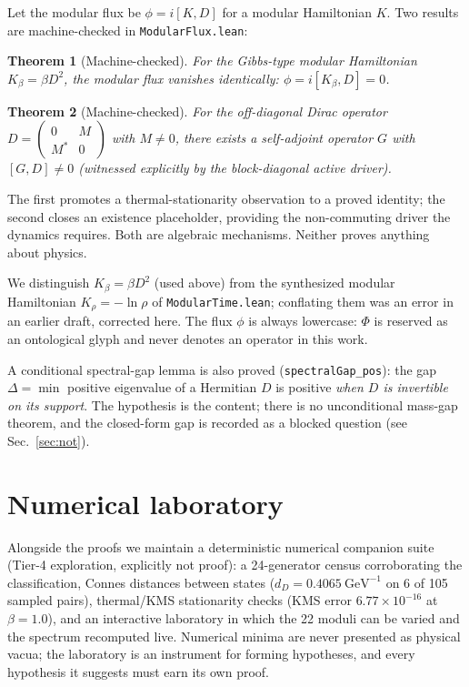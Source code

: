 \documentclass[aps,prd,twocolumn,superscriptaddress,showpacs]{revtex4-2}
\newtheorem{theorem}{Theorem}
\begin{document}
Let the modular flux be $\phi = i[K, D]$ for a modular
Hamiltonian $K$. Two results are machine-checked in
\texttt{ModularFlux.lean}:

\begin{theorem}[Machine-checked]
For the Gibbs-type modular Hamiltonian $K_\beta = \beta D^2$,
the modular flux vanishes identically:
$\phi = i[K_\beta, D] = 0$.
\end{theorem}

\begin{theorem}[Machine-checked]
For the off-diagonal Dirac operator
$D = \left(\begin{smallmatrix} 0 & M \\ M^* & 0 \end{smallmatrix}\right)$
with $M \neq 0$, there exists a self-adjoint operator $G$ with
$[G, D] \neq 0$ (witnessed explicitly by the block-diagonal
active driver).
\end{theorem}

The first promotes a thermal-stationarity observation to a
proved identity; the second closes an existence placeholder,
providing the non-commuting driver the dynamics requires.
Both are algebraic mechanisms. Neither proves anything about
physics.

We distinguish $K_\beta = \beta D^2$ (used above) from the
synthesized modular Hamiltonian $K_\rho = -\ln \rho$ of
\texttt{ModularTime.lean}; conflating them was an error in an
earlier draft, corrected here. The flux $\phi$ is always
lowercase: $\Phi$ is reserved as an ontological glyph and never
denotes an operator in this work.

A conditional spectral-gap lemma is also proved
(\texttt{spectralGap\_pos}): the gap $\Delta = \min$ positive
eigenvalue of a Hermitian $D$ is positive \emph{when $D$ is
invertible on its support}. The hypothesis is the content;
there is no unconditional mass-gap theorem, and the closed-form
gap is recorded as a blocked question (see Sec.~\ref{sec:not}).

\section{Numerical laboratory}

Alongside the proofs we maintain a deterministic numerical
companion suite (Tier-4 exploration, explicitly not proof):
a 24-generator census corroborating the classification, Connes
distances between states ($d_D = 0.4065\ \mathrm{GeV}^{-1}$ on
6 of 105 sampled pairs), thermal/KMS stationarity checks
(KMS error $6.77 \times 10^{-16}$ at $\beta = 1.0$), and an
interactive laboratory in which the 22 moduli can be varied
and the spectrum recomputed live. Numerical minima are never
presented as physical vacua; the laboratory is an instrument
for forming hypotheses, and every hypothesis it suggests must
earn its own proof.
\end{document}
